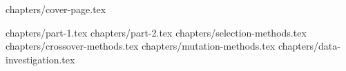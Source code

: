 \documentclass[a4paper,12pt]{article}
\begin{document}


{chapters/cover-page.tex}

\tableofcontents
\clearpage

{chapters/part-1.tex}
{chapters/part-2.tex}
{chapters/selection-methods.tex}
{chapters/crossover-methods.tex}
{chapters/mutation-methods.tex}
{chapters/data-investigation.tex}
\end{document}
